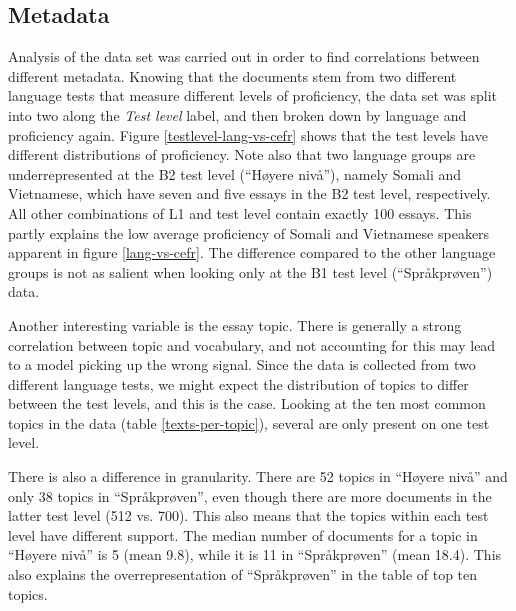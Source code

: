\subsection{Metadata}

Analysis of the data set was carried out in order to find correlations
between different metadata. Knowing that the documents stem from two
different language tests that measure different levels of proficiency, the
data set was split into two along the \emph{Test level} label, and then broken
down by language and proficiency again. Figure \ref{testlevel-lang-vs-cefr}
shows that the test levels have different distributions of proficiency. Note
also that two language groups are underrepresented at the B2 test level
(``Høyere nivå''), namely Somali and Vietnamese, which have seven and five
essays in the B2 test level, respectively. All other combinations of L1 and
test level contain exactly 100 essays. This partly explains the low average
proficiency of Somali and Vietnamese speakers apparent in figure
\ref{lang-vs-cefr}. The difference compared to the other language groups is
not as salient when looking only at the B1 test level (``Språkprøven'') data.

Another interesting variable is the essay topic. There is generally a strong
correlation between topic and vocabulary, and not accounting for this may
lead to a model picking up the wrong signal. Since the data is collected from
two different language tests, we might expect the distribution of topics to
differ between the test levels, and this is the case. Looking at the ten most
common topics in the data (table \ref{texts-per-topic}), several are only
present on one test level.

There is also a difference in granularity. There are 52 topics in ``Høyere
nivå'' and only 38 topics in ``Språkprøven'', even though there are more
documents in the latter test level (512 vs. 700). This also means that the
topics within each test level have different support. The median number of
documents for a topic in ``Høyere nivå'' is 5 (mean 9.8), while it is 11 in
``Språkprøven'' (mean 18.4). This also explains the overrepresentation of
``Språkprøven'' in the table of top ten topics.

